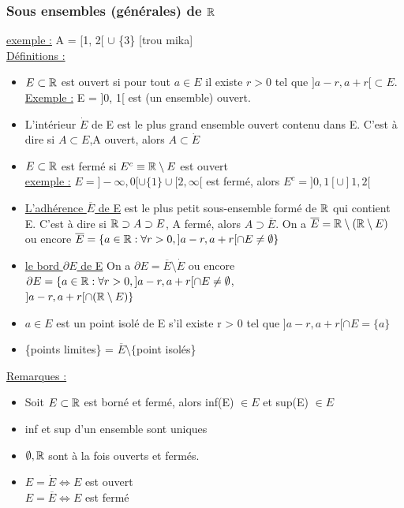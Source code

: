 \documentclass[12pt,a4paper]{article}
\begin{document}
\subsubsection{Sous ensembles (générales) de $\mathbb{R}$}
\underline{exemple :} A = [1, 2[ $\cup$ \{3\}
[trou mika]\\
\underline{Définitions :}
\begin{itemize}
\item $E \subset \mathbb{R}$ est ouvert si pour tout $a \in E$ il existe $r > 0$ tel que $]a-r, a+r[ \subset E$.\\
\underline{Exemple :} E = ]0, 1[ est (un ensemble) ouvert. 
\item L'intérieur $\dot{E}$ de E est le plus grand ensemble ouvert contenu dans E. C'est à dire si $A \subset E$,A ouvert, alors $A \subset \dot{E}$
	\item $E \subset \mathbb{R}$ est fermé si $E^c \equiv \mathbb{R}\setminus E$ est ouvert\\
	\underline{exemple :} $E = ]-\infty, 0[ \cup \{1\}\cup [2,\infty[$ est fermé, alors $E^c = ]0, 1[ \cup ]1, 2[$
	\item \underline{L'adhérence $\overline{E}$ de E} est le plus petit sous-ensemble formé de $\mathbb{R}$ qui contient E. C'est à dire si $\mathbb{R} \supset A \supset E$, A fermé, alors $A \supset \overline{E}$. On a $\overline{E} = \mathbb{R} \setminus (\mathbb{R} \setminus E)$ ou encore $\overline{E} = \{a \in \mathbb{R} : \forall r > 0, ]a-r, a+r[ \cap E \neq \emptyset\}$
	\item \underline{le bord $\partial E$ de E} On a $\partial E = \overline{E} \setminus \dot{E}$ ou encore $\partial E = \{a \in \mathbb{R} : \forall r >0, ]a-r, a+r[ \cap E \neq \emptyset$,\\
	$]a-r, a+r[ \cap (\mathbb{R} \setminus E) \}$
	\item $a \in E$ est un point isolé de E s'il existe r > 0 tel que $]a-r,a+r[ \cap E = \{a\}$
	\item \{points limites\} = $\overline{E} \setminus \{$point isolés\}
\end{itemize}

\underline{Remarques :}
\begin{itemize}
\item Soit $E \subset \mathbb{R}$ est borné et fermé, alors inf(E) $\in E$ et sup(E) $\in E$
\item inf et sup d'un ensemble sont uniques
\item $\emptyset, \mathbb{R}$ sont à la fois ouverts et fermés.
\item $E = \dot{E} \Leftrightarrow E$ est ouvert\\
$E = \overline{E} \Leftrightarrow E$ est fermé
\end{itemize}
\end{document}
